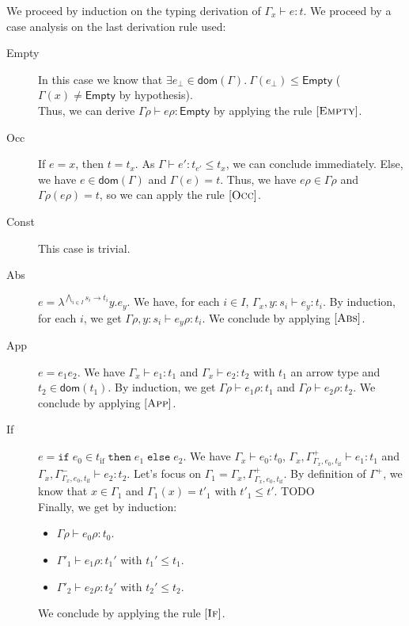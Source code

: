 \documentclass[a4paper]{article}%
\newcommand{\dom}[1]{\textsf{dom}(#1)}
\newcommand{\Empty} {\textsf{Empty}}%
\newcommand{\ite}[4]{\ensuremath{\texttt{if}\;#1\in#2\;\texttt{then}\;#3\;\texttt{else}\;#4}}
\theoremstyle{definition}
\newcommand {\Rule}[1] {[\textsc{#1}]}
\begin{document}
    We proceed by induction on the typing derivation of $\Gamma_x \vdash e:t$. We proceed by a case analysis on the last derivation rule used:
    \begin{description}
      \item[Empty] In this case we know that $\exists e_{\bot} \in \dom\Gamma.\ \Gamma(e_{\bot}) \leq \Empty$ ($\Gamma(x) \neq \Empty$ by hypothesis).\\
      Thus, we can derive $\Gamma\rho \vdash e\rho:\Empty$ by applying the rule $\Rule {Empty}$.
      \item[Occ] If $e=x$, then $t=t_x$. As $\Gamma \vdash e':t_{e'} \leq t_x$, we can conclude immediately. Else, we have $e \in \dom \Gamma$ and $\Gamma(e) = t$.
      Thus, we have $e\rho \in \Gamma\rho$ and $\Gamma\rho(e\rho)=t$, so we can apply the rule $\Rule {Occ}$.
      \item[Const] This case is trivial.
      \item[Abs] $e=\lambda^{\bigwedge_{i\in I} s_i \rightarrow t_i}y.e_y$. We have, for each $i \in I$, $\Gamma_x,y:s_i \vdash e_y:t_i$.
      By induction, for each $i$, we get  $\Gamma\rho,y:s_i \vdash e_y\rho:t_i$. We conclude by applying $\Rule {Abs}$.
      \item[App] $e=e_1 e_2$. We have $\Gamma_x\vdash e_1:t_1$ and $\Gamma_x\vdash e_2:t_2$ with $t_1$ an arrow type and $t_2 \in \dom {t_1}$.
      By induction, we get $\Gamma\rho\vdash e_1\rho:t_1$ and $\Gamma\rho\vdash e_2\rho:t_2$. We conclude by applying $\Rule {App}$.
      \item[If] $e=\ite {e_0} {t_{\text{if}}} {e_1}{e_2}$. We have $\Gamma_x\vdash e_0:t_0$, $\Gamma_x,\Gamma^+_{\Gamma_x,e_0,t_{\text{if}}}\vdash e_1 : t_1$ and $\Gamma_x,\Gamma^-_{\Gamma_x,e_0,t_{\text{if}}}\vdash e_2 : t_2$.
      Let's focus on $\Gamma_1=\Gamma_x,\Gamma^+_{\Gamma_x,e_0,t_{\text{if}}}$. By definition of $\Gamma^+$, we know that $x \in \Gamma_1$ and $\Gamma_1(x)=t'_1$ with $t'_1 \leq t'$.
      TODO\\
      Finally, we get by induction:
      \begin{itemize}
        \item $\Gamma\rho\vdash e_0\rho:t_0$.
        \item $\Gamma'_1\vdash e_1\rho:t_1'$ with $t_1' \leq t_1$.
        \item $\Gamma'_2\vdash e_2\rho:t_2'$ with $t_2' \leq t_2$.
      \end{itemize}
      We conclude by applying the rule $\Rule {If}$.
    \end{description}
\end{document}
